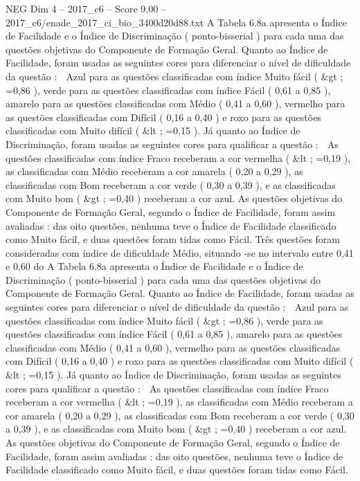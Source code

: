 \begin{textsample}{NEG Dim 4 – 2017\_c6 – Score 9.00 – 2017\_c6/enade\_2017\_ci\_bio\_3400d20d88.txt}
A Tabela 6.8a apresenta o Índice de Facilidade e o Índice de Discriminação ( ponto-bisserial ) para cada uma das questões objetivas do Componente de Formação Geral.
Quanto ao Índice de Facilidade, foram usadas as seguintes cores para diferenciar o nível de dificuldade da questão :  Azul para as questões classificadas com índice Muito fácil ( \&gt ; =0,86 ), verde para as questões classificadas com índice Fácil ( 0,61 a 0,85 ), amarelo para as questões classificadas com Médio ( 0,41 a 0,60 ), vermelho para as questões classificadas com Difícil ( 0,16 a 0,40 ) e roxo para as questões classificadas com Muito difícil ( \&lt ; =0,15 ).
Já quanto ao Índice de Discriminação, foram usadas as seguintes cores para qualificar a questão :  As questões classificadas com índice Fraco receberam a cor vermelha ( \&lt ; =0,19 ), as classificadas com Médio receberam a cor amarela ( 0,20 a 0,29 ), as classificadas com Bom receberam a cor verde ( 0,30 a 0,39 ), e as classificadas com Muito bom ( \&gt ; =0,40 ) receberam a cor azul.
As questões objetivas do Componente de Formação Geral, segundo o Índice de Facilidade, foram assim avaliadas : das oito questões, nenhuma teve o Índice de Facilidade classificado como Muito fácil, e duas questões foram tidas como Fácil.
Três questões foram consideradas com índice de dificuldade Médio, situando -se no intervalo entre 0,41 e 0,60 do A Tabela 6.8a apresenta o Índice de Facilidade e o Índice de Discriminação ( ponto-bisserial ) para cada uma das questões objetivas do Componente de Formação Geral.
Quanto ao Índice de Facilidade, foram usadas as seguintes cores para diferenciar o nível de dificuldade da questão :  Azul para as questões classificadas com índice Muito fácil ( \&gt ; =0,86 ), verde para as questões classificadas com índice Fácil ( 0,61 a 0,85 ), amarelo para as questões classificadas com Médio ( 0,41 a 0,60 ), vermelho para as questões classificadas com Difícil ( 0,16 a 0,40 ) e roxo para as questões classificadas com Muito difícil ( \&lt ; =0,15 ).
Já quanto ao Índice de Discriminação, foram usadas as seguintes cores para qualificar a questão :  As questões classificadas com índice Fraco receberam a cor vermelha ( \&lt ; =0,19 ), as classificadas com Médio receberam a cor amarela ( 0,20 a 0,29 ), as classificadas com Bom receberam a cor verde ( 0,30 a 0,39 ), e as classificadas com Muito bom ( \&gt ; =0,40 ) receberam a cor azul.
As questões objetivas do Componente de Formação Geral, segundo o Índice de Facilidade, foram assim avaliadas : das oito questões, nenhuma teve o Índice de Facilidade classificado como Muito fácil, e duas questões foram tidas como Fácil.

\end{textsample}

